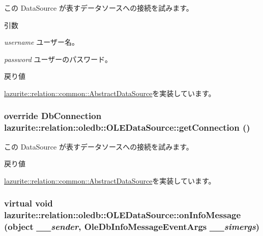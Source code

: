 この DataSource が表すデータソースへの接続を試みます。 
\begin{DoxyParams}{引数}
\item[{\em username}]ユーザー名。\item[{\em password}]ユーザーのパスワード。\end{DoxyParams}
\begin{DoxyReturn}{戻り値}

\end{DoxyReturn}


\hyperlink{classlazurite_1_1relation_1_1common_1_1_abstract_data_source_a1e828b5e7c1e29b21439d910f05005aa}{lazurite::relation::common::AbstractDataSource}を実装しています。\hypertarget{classlazurite_1_1relation_1_1oledb_1_1_o_l_e_data_source_a7dbd44842590d2d1f11a6ddca7a393b7}{
\subsubsection[{getConnection}]{\setlength{\rightskip}{0pt plus 5cm}override DbConnection lazurite::relation::oledb::OLEDataSource::getConnection ()}}
\label{classlazurite_1_1relation_1_1oledb_1_1_o_l_e_data_source_a7dbd44842590d2d1f11a6ddca7a393b7}


この DataSource が表すデータソースへの接続を試みます。 \begin{DoxyReturn}{戻り値}

\end{DoxyReturn}


\hyperlink{classlazurite_1_1relation_1_1common_1_1_abstract_data_source_a1706b5b8821b00ad2391dd0fcf98a767}{lazurite::relation::common::AbstractDataSource}を実装しています。\hypertarget{classlazurite_1_1relation_1_1oledb_1_1_o_l_e_data_source_af993859278174a7c0a6117ab7b7f4a2a}{
\subsubsection[{onInfoMessage}]{\setlength{\rightskip}{0pt plus 5cm}virtual void lazurite::relation::oledb::OLEDataSource::onInfoMessage (object {\em \_\-\_\-sender}, \/  OleDbInfoMessageEventArgs {\em \_\-\_\-simergs})}}
\label{classlazurite_1_1relation_1_1oledb_1_1_o_l_e_data_source_af993859278174a7c0a6117ab7b7f4a2a}


